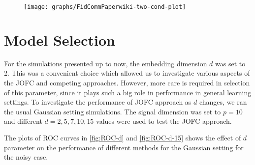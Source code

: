 \documentclass[12pt,oneside,final]{thesis}\usepackage[]{graphicx}\usepackage[]{color}
\begin{document}
\begin{figure}
 \centering
\texttt{[image: graphs/FidCommPaperwiki-two-cond-plot]} 
\end{figure}



\section{Model Selection}
For the simulations presented up to now, the embedding dimension $d$ was set to 2. This was a convenient choice which allowed us to investigate various aspects of the JOFC and competing approaches.
However,  more care is required in selection of this parameter, since it plays such a big role in performance in general learning settings. To investigate the performance of JOFC approach as $d$ changes, we ran the usual Gaussian setting simulations. The signal dimension was set to $p=10$ and different $d=2,5,7,10,15$ values were used to test the JOFC approach.

The  plots of ROC curves in    \ref{fig:ROC-d} and  \ref{fig:ROC-d-15} shows the effect of $d$ parameter on the performance of different methods for the Gaussian setting for the noisy case.
\end{document}
